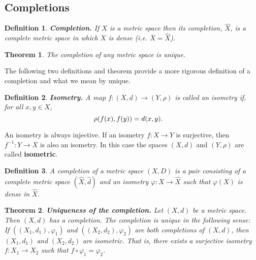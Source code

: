 \documentclass[two column]{article}
\newtheorem{theorem}{Theorem}[subsection]
\newtheorem{definition}{Definition}[subsection]
\begin{document}
\subsection{Completions}

\begin{definition}
{\bf Completion.} If $X$ is a metric space then its completion, $\widehat{X}$, is a complete metric space in which $X$ is dense (i.e. $\overline{X} = \widehat{X}$). \\
\end{definition}

\begin{theorem}
The completion of any metric space is unique.
\end{theorem}

\vspace{+6pt} The following two definitions and theorem provide a more rigorous definition of a completion and what we mean by unique.\\

\begin{definition}
{\bf Isometry.} A map $f:(X,d) \rightarrow (Y,\rho)$ is called an isometry if, for all $x,y \in X$, \vspace{-6pt}
\[
\rho(f(x),f(y)) = d(x,y).
\vspace{-6pt}\]
\end{definition}

An isometry is always injective. If an isometry $f:X \rightarrow Y$ is surjective, then $f^{-1}:Y \rightarrow X$ is also an isometry. In this case the spaces $(X,d)$ and $(Y,\rho)$ are called {\bf isometric}. \\

\begin{definition}
A completion of a metric space $(X,D)$ is a pair consisting of a complete metric space $(\widehat{X},\widehat{d})$ and an isometry $\varphi:X \rightarrow \widehat{X}$ such that $\varphi(X)$ is dense in $\widehat{X}$.\\
\end{definition}

\begin{theorem}
{\bf Uniqueness of the completion.} Let $(X,d)$ be a metric space. Then $(X,d)$ has a completion. The completion is unique in the following sense: If $((X_{1},d_{1}), \varphi_{1})$ and $((X_{2},d_{2}), \varphi_{2})$ are both completions of $(X,d)$, then $(X_{1},d_{1})$ and $(X_{2},d_{2})$ are isometric. That is, there exists a surjective isometry $f:X_{1} \rightarrow X_{2}$ such that $f \circ \varphi_{1} = \varphi_{2}$. 
\end{theorem}
\end{document}
